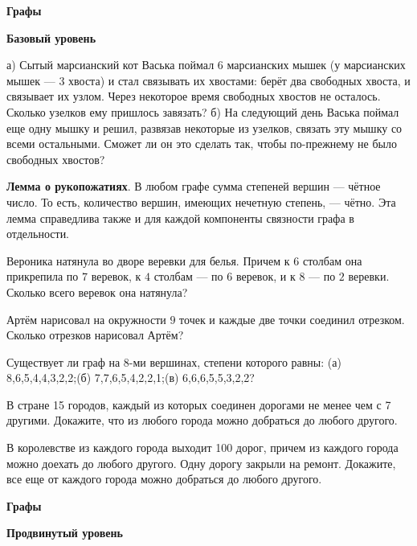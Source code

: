 \hspace{3mm}

\centerline{\bf \Huge Графы}

\centerline{\bf \large Базовый уровень}

\begin{flushright}
        \scriptsize{}
\end{flushright}

 а) Сытый марсианский кот Васька поймал 6 марсианских мышек (у марсианских мышек --- 3 хвоста) и стал связывать их хвостами: берёт два свободных хвоста, и связывает их узлом. Через некоторое время свободных хвостов не осталось. Сколько узелков ему пришлось завязать? б) На следующий день Васька поймал еще одну мышку и решил, развязав некоторые из узелков, связать эту мышку со всеми остальными. Сможет ли он это сделать так, чтобы по-прежнему не было свободных хвостов?

\textbf{Лемма о рукопожатиях}. В любом графе сумма степеней вершин --- чётное число. То есть, количество вершин, имеющих нечетную степень, --- чётно. Эта лемма справедлива также и для каждой компоненты связности графа в отдельности.

Вероника натянула во дворе веревки для белья. Причем к $6$ столбам она прикрепила по $7$ веревок, к $4$ столбам --- по 6 веревок, и к $8$ --- по $2$ веревки. Сколько всего веревок она натянула?

Артём нарисовал на окружности $9$ точек и каждые две точки соединил отрезком. Сколько отрезков нарисовал Артём?

Существует ли граф на 8-ми вершинах, степени которого равны:
(а) 8,6,5,4,4,3,2,2;(б) 7,7,6,5,4,2,2,1;(в) 6,6,6,5,5,3,2,2?

В стране 15 городов, каждый из которых соединен дорогами не менее чем с 7 другими. Докажите, что из любого города можно добраться до любого другого.

 В королевстве из каждого города выходит 100 дорог, причем из каждого города можно доехать до любого другого. Одну дорогу закрыли на ремонт. Докажите, все еще от каждого города можно добраться до любого другого.


\newpage

\hspace{3mm}

\centerline{\bf \Huge Графы}

\centerline{\bf \large Продвинутый уровень}

\begin{flushright}
        \scriptsize{}
\end{flushright}

